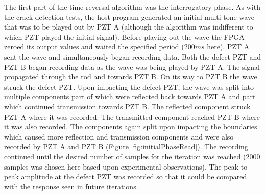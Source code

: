 The first part of the time reversal algorithm was the interrogatory phase. As with the crack detection tests, the host program generated an initial multi-tone wave that was to be played out by PZT A (although the algorithm was indifferent to which PZT played the initial signal). Before playing out the wave the FPGA zeroed its output values and waited the specified period ($200ms$ here). PZT A sent the wave and simultaneously began recording data. Both the defect PZT and PZT B began recording data as the wave was being played by PZT A. The signal propagated through the rod and towards PZT B. On its way to PZT B the wave struck the defect PZT. Upon impacting the defect PZT, the wave was split into multiple components part of which were reflected back towards PZT A and part which continued transmission towards PZT B. The reflected component struck PZT A where it was recorded. The transmitted component reached PZT B where it was also recorded. The components again split upon impacting the boundaries which caused more reflection and transmission components and were also recorded by PZT A and PZT B (Figure \ref{fig:initialPhaseRead}). The recording continued until the desired number of samples for the iteration was reached (2000 samples was chosen here based upon experimental observations). The peak to peak amplitude at the defect PZT was recorded so that it could be compared with the response seen in future iterations.



